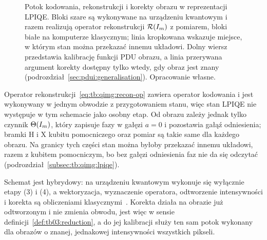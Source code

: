 \begin{figure}[tb]
\centering

\caption[Potok kodowania, rekonstrukcji i korekty obrazu w reprezentacji LPIQE]{Potok kodowania, rekonstrukcji i korekty obrazu w reprezentacji LPIQE.
Bloki szare są wykonywane na urządzeniu kwantowym i razem realizują operator rekonstrukcji $\mathcal{R}(I_m)$ z pomiarem, bloki białe na komputerze klasycznym; linia kropkowana wskazuje miejsce, w którym stan można przekazać innemu układowi.
Dolny wiersz przedstawia kalibrację funkcji PDU obrazu, a linia przerywana argument korekty dostępny tylko wtedy, gdy obraz jest znany (podrozdział~\ref{sec:pdui:generalisation}).
Opracowanie własne.}
\label{fig:pdui:pipeline}
\end{figure}

Operator rekonstrukcji~\eqref{eq:tb:qimg:recon-op} zawiera operator kodowania i jest wykonywany w jednym obwodzie z przygotowaniem stanu, więc stan LPIQE nie występuje w tym schemacie jako osobny etap.
Od obrazu zależy jednak tylko czynnik $\Theta(I_m)$, który zapisuje fazy w gałęzi $a=0$ i pozostawia gałąź odniesienia; bramki $\mathrm{H}$ i $\mathrm{X}$ kubitu pomocniczego oraz pomiar są takie same dla każdego obrazu.
Na granicy tych części stan można byłoby przekazać innemu układowi, razem z kubitem pomocniczym, bo bez gałęzi odniesienia faz nie da się odczytać (podrozdział~\ref{subsec:tb:qimg:lpiqe}).

Schemat jest hybrydowy: na urządzeniu kwantowym wykonuje się wyłącznie etapy (3) i (4), a wektoryzacja, wyznaczenie operatora, odtworzenie intensywności i korekta są obliczeniami klasycznymi~\cite{werner_error_reduction_2025}.
Korekta działa na obrazie już odtworzonym i nie zmienia obwodu, jest więc  w sensie definicji~\ref{def:tb03:reduction}, a do jej kalibracji służy ten sam potok wykonany dla obrazów o znanej, jednakowej intensywności wszystkich pikseli.

